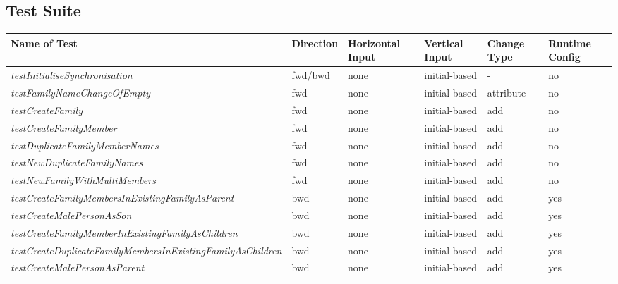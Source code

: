 \subsection{Test Suite}
\label{sec:TestSuite}



\renewcommand{\arraystretch}{1.2}

\begin{table*}[!tbp]
	\begin{tabular}{M{7cm}|M{1.4cm}|M{1.6cm}|M{1.9cm}|M{1.3cm}|M{1.3cm}}
		\textbf{Name of Test} & \textbf{Direction} & \textbf{Horizontal Input} & \textbf{Vertical Input} & \textbf{Change Type} & \textbf{Runtime Config}  \\ \hline
		\textit{testInitialiseSynchronisation} & fwd/bwd & none & initial-based & - & no   \\ \hline
		\textit{testFamilyNameChangeOfEmpty} & fwd & none & initial-based & attribute  & no \\ \hline
		\textit{testCreateFamily} & fwd & none & initial-based & add & no \\ \hline
		\textit{testCreateFamilyMember} & fwd & none & initial-based & add & no \\ \hline
		\textit{testDuplicateFamilyMemberNames} & fwd & none & initial-based & add & no \\ \hline
		\textit{testNewDuplicateFamilyNames} & fwd & none & initial-based & add & no \\ \hline
		\textit{testNewFamilyWithMultiMembers} & fwd & none & initial-based & add & no \\ \hline
		\textit{testCreateFamilyMembersInExistingFamily\-As\-Parent} & bwd & none & initial-based & add & yes \\ \hline
		\textit{testCreateMalePersonAsSon} & bwd & none & initial-based & add & yes \\ \hline
		\textit{testCreateFamilyMemberInExistingFamily\-As\-Children} & bwd & none & initial-based & add & yes \\ \hline
		\textit{testCreateDuplicateFamilyMembersInExisting\-Family\-As\-Children} & bwd & none & initial-based & add & yes \\ \hline
		\textit{testCreateMalePersonAsParent} & bwd & none & initial-based & add & yes \\ \hline

\end{tabular}
\end{table*}
